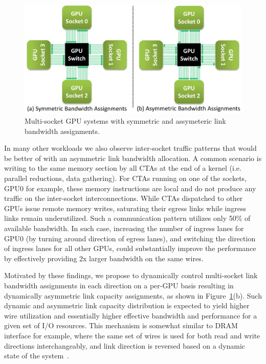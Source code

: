 \begin{figure}[t]
    \centering
    \includegraphics[width=1.0\columnwidth]{figures/tms_links.pdf}
    \caption{Multi-socket GPU systems with symmetric and assymeteric link
    bandwidth assignments.}
    \label{fig:symmetric_assymetric}
\end{figure}

In many other workloads we also observe inter-socket traffic patterns that
would be better of with an asymmetric link bandwidth allocation. A common
scenario is writing to the same memory section by all CTAs at the end of a
kernel (i.e. parallel reductions, data gathering). For CTAs running on one of the
sockets, GPU0 for example, these memory instructions are local and do not
produce any traffic on the inter-socket interconnections. While CTAs dispatched
to other GPUs issue remote memory writes, saturating their egress links while
ingress links remain underutilized. Such a communication pattern utilizes only
50\% of available bandwidth. In such case, increasing the number of ingress lanes for GPU0
(by turning around direction of egress lanes), and switching the direction of
ingress lanes for all other GPUs, could substantially improve the performance
by effectively providing 2x larger bandwidth on the same wires. 

Motivated by these findings, we propose to dynamically control multi-socket
link bandwidth assignments in each direction on a per-GPU basis resulting in
dynamically asymmetric link capacity assignments, as shown in
Figure~\ref{fig:symmetric_assymetric}(b). Such dynamic and asymmetric link
capacity distribution is expected to yield higher wire utilization and
essentially higher effective bandwidth and performance for a given set of I/O
resources. This mechanism is somewhat similar to DRAM interface for example,
where the same set of wires is used for both read and write directions
interchangeably, and link direction is reversed based on a dynamic state of the
system~\cite{jedecDDR3}. 

